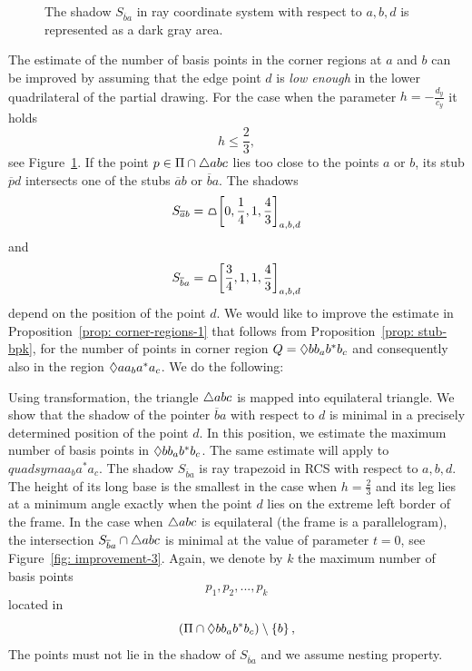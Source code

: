 \begin{figure}
\begin{center}

\end{center}
\caption{The shadow $S_{\overline{b}a}$ in ray coordinate system with respect to $a,b,d$ is represented as a dark gray area.}
\label{fig: corner-regions-improvement-1}
\end{figure}

The estimate of the number of basis points in the corner regions at $a$ and $b$ can be improved by assuming that the edge point $d$ is \textit{low enough} in the lower quadrilateral of the partial drawing. For the case when the parameter $h = -\frac{d_{y}}{c_{y}}$ it holds
$$
h \leq \frac{2}{3},
$$
see Figure~\ref{fig: corner-regions-improvement-1}. If the point $p \in \Pi \cap \triangle{abc}$ lies too close to the points $a$ or $b$, its stub $\overline{p}d$ intersects one of the stubs $\overline{a}b$ or $\overline{b}a$. The shadows
$$
S_{\overline{a}b} = \tpz{\left[ 0,\frac{1}{4},1,\frac{4}{3} \right]_{a,b,d}}
$$
and
$$
S_{\overline{b}a} = \tpz{\left[ \frac{3}{4},1,1,\frac{4}{3} \right]_{a,b,d}}
$$
depend on the position of the point $d$. We would like to improve the estimate in Proposition~\ref{prop: corner-regions-1} that follows from Proposition~\ref{prop: stub-bpk}, for the number of points in corner region $Q = \Diamond{bb_{a}b^{*}b_{c}}$ and consequently also in the region $\Diamond{aa_{b}a^{*}a_{c}}$. We do the following:

Using transformation, the triangle $\triangle{abc}$ is mapped into equilateral triangle. We show that the shadow of the pointer $\overline{b}a$ with respect to $d$ is minimal in a precisely determined position of the point $d$. In this position, we estimate the maximum number of basis points in $\Diamond{bb_{a}b^{*}b_{c}}$. The same estimate will apply to $quadsym{aa_{b}a^{*}a_{c}}$. The shadow $S_{\overline{b}a}$ is ray trapezoid in RCS with respect to $a, b, d$. The height of its long base is the smallest in the case when $h = \frac{2}{3}$ and its leg lies at a minimum angle exactly when the point $d$ lies on the extreme left border of the frame. In the case when $\triangle{abc}$ is equilateral (the frame is a parallelogram), the intersection $S_{\overline{b}a} \cap \triangle{abc}$ is minimal at the value of parameter $t = 0$, see Figure~\ref{fig: improvement-3}. Again, we denote by $k$ the maximum number of basis points 
$$
p_{1}, p_{2}, ..., p_{k}
$$
located in
$$
\left(\Pi \cap \Diamond{bb_{a}b^{*}b_{c}}\right) \setminus \left\{ b \right\},
$$
The points must not lie in the shadow of $S_{\overline{b}a}$ and we assume nesting property.

